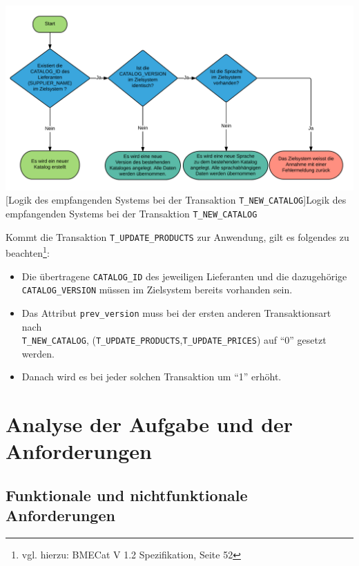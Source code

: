 	\begin{minipage}{\linewidth}
		\vspace{1em}
		\centering
		\includegraphics[width=0.8\linewidth]{img/newCatalogLogik}
		[Logik des empfangenden Systems bei der Transaktion  \texttt{T\_NEW\_CATALOG}]{Logik des empfangenden Systems bei der Transaktion  \texttt{T\_NEW\_CATALOG}}
		\label{fig:header}
		\vspace{1em}
	\end{minipage}
	
	Kommt die Transaktion \texttt{T\_UPDATE\_PRODUCTS} zur Anwendung, gilt es folgendes zu beachten\footnote{vgl. hierzu: BMECat V 1.2 Spezifikation, Seite 52}: 
	\begin{itemize}
		\item Die übertragene \texttt{CATALOG\_ID} des jeweiligen Lieferanten und die dazugehörige\\ \texttt{CATALOG\_VERSION} müssen im Zielsystem bereits vorhanden sein.
		\item Das Attribut \texttt{prev\_version} muss bei der ersten anderen Transaktionsart nach\\ \texttt{T\_NEW\_CATALOG}, (\texttt{T\_UPDATE\_PRODUCTS},\texttt{T\_UPDATE\_PRICES}) auf \enquote{0} gesetzt werden.
		\item Danach wird es bei jeder solchen Transaktion um \enquote{1} erhöht.
	\end{itemize}
		
	\section{Analyse der Aufgabe und der Anforderungen}
	
	\subsection{Funktionale und nichtfunktionale Anforderungen}	
		
